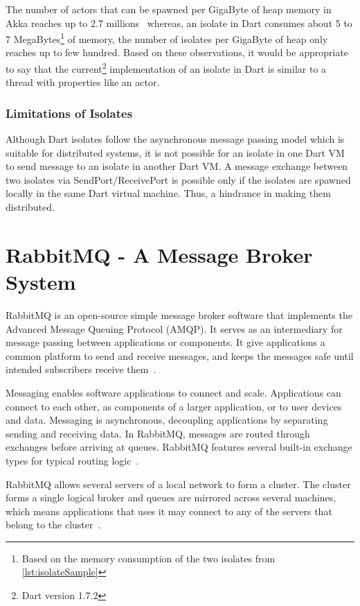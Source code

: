   The number of actors that can be spawned per GigaByte of heap memory in Akka reaches up to 2.7 millions~\cite{akkaHome} whereas, an isolate in Dart consumes about 5 to 7 MegaBytes\footnote{Based on the memory consumption of the two isolates from \autoref{lst:isolateSample}} of memory, the number of isolates per GigaByte of heap only reaches up to few hundred. Based on these observations, it would be appropriate to say that the current\footnote{Dart version 1.7.2} implementation of an isolate in Dart is \textemdash{} similar to a thread with properties like an actor.

  \subsubsection{Limitations of Isolates}
  Although Dart isolates follow the asynchronous message passing model which is suitable for distributed systems, it is not possible for an isolate in one Dart VM to send message to an isolate in another Dart VM. A message exchange between two isolates via SendPort/ReceivePort is possible only if the isolates are spawned locally in the same Dart virtual machine. Thus, a hindrance in making them distributed.

\section{RabbitMQ - A Message Broker System}
\label{sec:rabbitmq}
  RabbitMQ is an open-source simple message broker software that implements the Advanced Message Queuing Protocol (AMQP). It serves as an intermediary for message passing between applications or components. It give applications a common platform to send and receive messages, and keeps the messages safe until intended subscribers receive them~\cite{rabbitmqFeatures}.

  Messaging enables software applications to connect and scale. Applications can connect to each other, as components of a larger application, or to user devices and data. Messaging is asynchronous, decoupling applications by separating sending and receiving data. In RabbitMQ, messages are routed through exchanges before arriving at queues. RabbitMQ features several built-in exchange types for typical routing logic~\cite{rabbitmqFeatures}.

  RabbitMQ allows several servers of a local network to form a cluster. The cluster forms a single logical broker and queues are mirrored across several machines, which means applications that uses it may connect to any of the servers that belong to the cluster~\cite{rabbitmqFeatures}.

